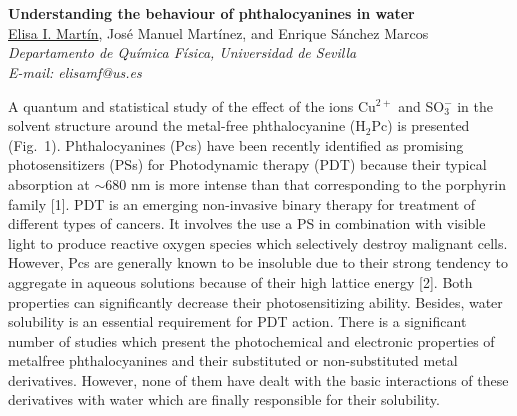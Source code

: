 \setcounter{figure}{0}
\section*{}
\begin{center}
{\bf \Large
Understanding the behaviour of phthalocyanines in water
}
\\
\vspace{0.5cm}
\underline{Elisa I. Martín}, José Manuel Martínez, and Enrique Sánchez Marcos
\\
\vspace{0.5cm}
{\it 
Departamento de Química Física, Universidad de Sevilla
}
\\
\vspace{0.5cm}
{\it E-mail: elisamf@us.es}
\\
\vspace{0.5cm}
\end{center}
A quantum and statistical study of the effect of the ions Cu$^{2+}$ and SO$_{3}^{-}$ in the solvent
structure around the metal-free phthalocyanine (H$_{2}$Pc) is presented (Fig.~1).
Phthalocyanines (Pcs) have been recently identified as promising photosensitizers (PSs) for
Photodynamic therapy (PDT) because their typical absorption at $\sim$680 nm is more intense than
that corresponding to the porphyrin family [1]. PDT is an emerging non-invasive binary therapy
for treatment of different types of cancers. It involves the use a PS in combination with visible
light to produce reactive oxygen species which selectively destroy malignant cells. However, Pcs
are generally known to be insoluble due to their strong tendency to aggregate in aqueous solutions
because of their high lattice energy [2]. Both properties can significantly decrease their photosensitizing ability.
Besides, water solubility is an essential requirement for PDT action. There is a
significant number of studies which present the photochemical and electronic properties of metalfree phthalocyanines
and their substituted or non-substituted metal derivatives. However, none
of them have dealt with the basic interactions of these derivatives with water which are finally
responsible for their solubility.

